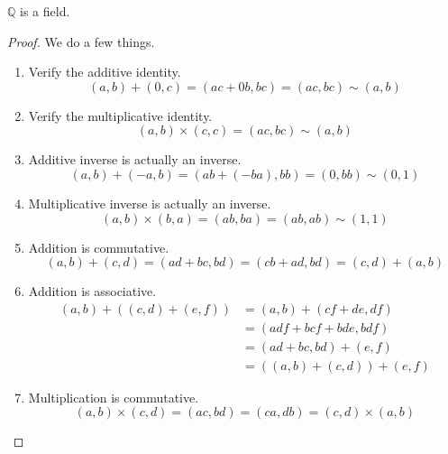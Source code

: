 \documentclass{article}
\begin{document}
      \begin{theorem}
        $\mathbb{Q}$ is a field. 
      \end{theorem} 
      \begin{proof}
        We do a few things. 
        \begin{enumerate}
          \item Verify the additive identity. 
          \begin{equation}
            (a, b) + (0, c) = (ac + 0b, bc) = (ac, bc) \sim (a, b)
          \end{equation}
          \item Verify the multiplicative identity. 
          \begin{equation}
            (a, b) \times (c, c) = (ac, bc) \sim (a, b)
          \end{equation}
          \item Additive inverse is actually an inverse. 
          \begin{equation}
            (a, b) + (-a, b) = (ab + (-ba), bb) = (0, bb) \sim (0, 1)
          \end{equation}
          \item Multiplicative inverse is actually an inverse. 
          \begin{equation}
            (a, b) \times (b, a) = (ab, ba) = (ab, ab) \sim (1, 1)
          \end{equation}
          \item Addition is commutative. 
          \begin{equation}
            (a, b) + (c, d) = (ad + bc, bd) = (cb + ad, bd) = (c, d) + (a, b)
          \end{equation}
          \item Addition is associative. 
          \begin{align}
            (a, b) + ((c, d) + (e, f)) & = (a, b) + (cf + de, df) \\
                                       & = (adf + bcf + bde, bdf) \\
                                       & = (ad + bc, bd) + (e, f) \\
                                       & = ((a, b) + (c, d)) + (e, f)
          \end{align}
          \item Multiplication is commutative. 
          \begin{equation}
            (a, b) \times (c, d) = (ac, bd) = (ca, db) = (c, d) \times (a, b)

\end{equation}
\end{enumerate}
\end{proof}
\end{document}
